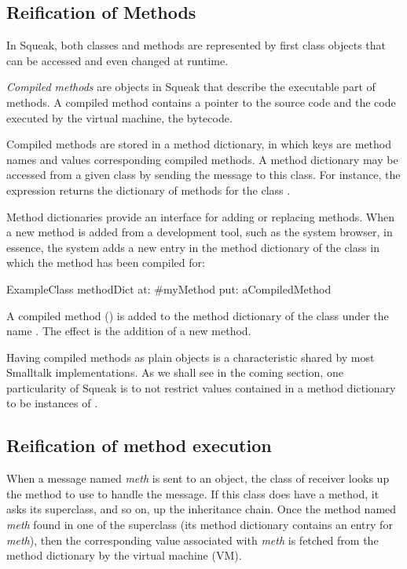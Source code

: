 \documentclass[a4paper,10pt,twoside]{book}
\begin{document}
\subsection{Reification of Methods} 

In Squeak, both classes and methods are represented by first class objects that can be accessed and even changed at runtime. 

\emph{Compiled methods} are objects in Squeak that describe the executable part of methods. A compiled method contains a pointer to the source code and the code executed by the virtual machine, the bytecode.

Compiled methods are stored in a method dictionary, in which keys are method names and values corresponding compiled methods. A method dictionary may be accessed from a given class by sending the message  to this class. For instance, the expression  returns the dictionary of methods for the class .

Method dictionaries provide an interface for adding or replacing methods. When a new method is added from a development tool, such as the system browser, in essence, the system adds a new entry in the method dictionary of the class in which the method has been compiled for:

\begin{code}{}
ExampleClass methodDict at: #myMethod put: aCompiledMethod
\end{code}

A compiled method () is added to the method dictionary of the class  under the name . The effect is the addition of a new method.

Having compiled methods as plain objects is a characteristic shared by most Smalltalk implementations. As we shall see in the coming section, one particularity of Squeak is to not restrict values contained in a method dictionary to be instances of .

\subsection{Reification of method execution}

When a message named \emph{meth} is sent to an object, the class of receiver looks up the method to use to handle the message. If this class does have a method, it asks its superclass, and so on, up the inheritance chain. Once the method named \emph{meth} found in one of the superclass (\ie its method dictionary contains an entry for \emph{meth}), then the corresponding value associated with \emph{meth} is fetched from the method dictionary by the virtual machine (VM).
\end{document}

